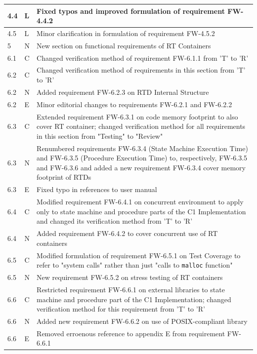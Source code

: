 \documentclass[a4paper,10pt]{article}
\begin{document}
\begin{longtable}{|p{1.5cm}|p{1cm}|p{8cm}|}
\hline
4.4 & L & Fixed typos and improved formulation of requirement FW-4.4.2 \\
\hline
4.5 & L & Minor clarification in formulation of requirement FW-4.5.2 \\
\hline
5 & N & New section on functional requirements of RT Containers \\
\hline
6.1 & C & Changed verification method of requirement FW-6.1.1 from 'T' to 'R' \\
\hline
6.2 & C & Changed verification method of requirements in this section from 'T' to 'R' \\
\hline
6.2 & N & Added requirement FW-6.2.3 on RTD Internal Structure \\
\hline
6.2 & E & Minor editorial changes to requirements FW-6.2.1 and FW-6.2.2 \\
\hline
6.3 & C & Extended requirement FW-6.3.1 on code memory footprint to also cover RT container; changed verification method for all requirements in this section from "Testing" to "Review" \\
\hline
6.3 & N & Renumbered requirements FW-6.3.4 (State Machine Execution Time) and FW-6.3.5 (Procedure Execution Time) to, respectively, FW-6.3.5 and FW-6.3.6 and added a new requirement FW-6.3.4 cover memory footprint of RTDs \\
\hline
6.3 & E & Fixed typo in references to user manual \\
\hline
6.4 & C & Modified requirement FW-6.4.1 on concurrent environment to apply only to state machine and procedure parts of the C1 Implementation and changed its verification method from 'T' to 'R' \\
\hline
6.4 & N & Added requirement FW-6.4.2 to cover concurrent use of RT containers \\
\hline
6.5 & C & Modified formulation of requirement FW-6.5.1 on Test Coverage to refer to "system calls" rather than just "calls to \texttt{malloc} function"\\
\hline
6.5 & N & New requirement FW-6.5.2 on stress testing of RT containers \\
\hline
6.6 & C & Restricted requirement FW-6.6.1 on external libraries to state machine and procedure part of the C1 Implementation; changed verification method for this requirement  from 'T' to 'R' \\
\hline
6.6 & N & Added new requirement FW-6.6.2 on use of POSIX-compliant library \\
\hline
6.6 & E & Removed erroenous reference to appendix E from requirement FW-6.6.1 \\

\end{longtable}
\end{document}
